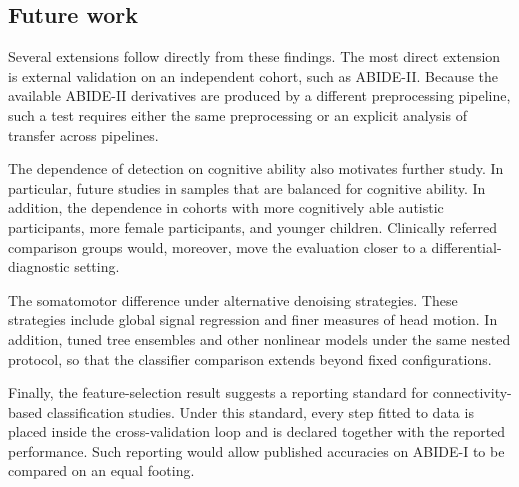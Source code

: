\subsection{Future work}
\label{subsec:future-work}

Several extensions follow directly from these findings. The most direct extension is
external validation on an independent cohort, such as ABIDE-II. Because the available
ABIDE-II derivatives are produced by a different preprocessing pipeline, such a test requires
either the same preprocessing or an explicit analysis of transfer across pipelines.

The dependence of detection on cognitive ability also motivates further study. In particular,
future studies  in samples that are balanced for cognitive ability. In addition,
the dependence  in cohorts with more cognitively able autistic participants,
more female participants, and younger children. Clinically referred comparison groups would,
moreover, move the evaluation closer to a differential-diagnostic setting.

The somatomotor difference  under alternative denoising strategies.
These strategies include global signal regression and finer measures of head motion. In
addition, tuned tree ensembles and other nonlinear models  under the same
nested protocol, so that the classifier comparison extends beyond fixed configurations.

Finally, the feature-selection result suggests a reporting standard for connectivity-based
classification studies. Under this standard, every step fitted to data is placed inside the
cross-validation loop and is declared together with the reported performance. Such reporting
would allow published accuracies on ABIDE-I to be compared on an equal footing.
